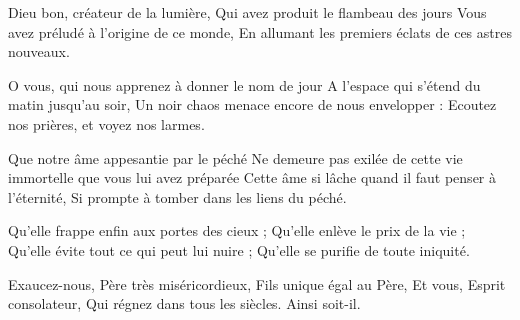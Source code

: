 Dieu bon, créateur de la lumière,
Qui avez produit le flambeau des jours
Vous avez préludé à l'origine de ce monde,
En allumant les premiers éclats de ces astres nouveaux.

O vous, qui nous apprenez à donner le nom de jour
A l'espace qui s'étend du matin jusqu'au soir,
Un noir chaos menace encore de nous envelopper :
Ecoutez nos prières, et voyez nos larmes.

Que notre âme appesantie par le péché
Ne demeure pas exilée de cette vie immortelle que vous lui avez préparée
Cette âme si lâche quand il faut penser à l'éternité,
Si prompte à tomber dans les liens du péché.

Qu'elle frappe enfin aux portes des cieux ;
Qu'elle enlève le prix de la vie ;
Qu'elle évite tout ce qui peut lui nuire ;
Qu'elle se purifie de toute iniquité.

Exaucez-nous, Père très miséricordieux,
Fils unique égal au Père,
Et vous, Esprit consolateur,
Qui régnez dans tous les siècles.
Ainsi soit-il.